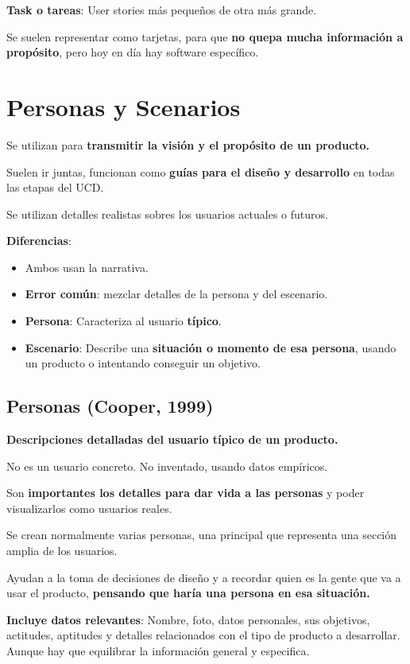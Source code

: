 \documentclass[12pt]{report} %
\begin{document}
\textbf{Task o tareas}: User stories más pequeños de otra más grande.

Se suelen representar como tarjetas, para que \textbf{no quepa mucha
información a propósito}, pero hoy en día hay software específico.

\section{Personas y Scenarios}

Se utilizan para \textbf{transmitir la visión y el propósito de un
producto.}

Suelen ir juntas, funcionan como \textbf{guías para el diseño y
desarrollo} en todas las etapas del UCD.

Se utilizan detalles realistas sobres los usuarios actuales o futuros.

\textbf{Diferencias}:

\begin{itemize}

\item
  Ambos usan la narrativa.
\item
  \textbf{Error común}: mezclar detalles de la persona y del escenario.
\item
  \textbf{Persona}: Caracteriza al usuario \textbf{típico}.
\item
  \textbf{Escenario}: Describe una \textbf{situación o momento de esa
  persona}, usando un producto o intentando conseguir un objetivo.
\end{itemize}

\subsection{Personas (Cooper, 1999)}

\textbf{Descripciones detalladas del usuario típico de un producto.}

No es un usuario concreto. No inventado, usando datos empíricos.

Son \textbf{importantes los detalles para dar vida a las personas} y
poder visualizarlos como usuarios reales.

Se crean normalmente varias personas, una principal que representa una
sección amplia de los usuarios.

Ayudan a la toma de decisiones de diseño y a recordar quien es la gente
que va a usar el producto, \textbf{pensando que haría una persona en esa
situación.}

\textbf{Incluye datos relevantes}: Nombre, foto, datos personales, sus
objetivos, actitudes, aptitudes y detalles relacionados con el tipo de
producto a desarrollar. Aunque hay que equilibrar la información general
y especifica.
\end{document}
